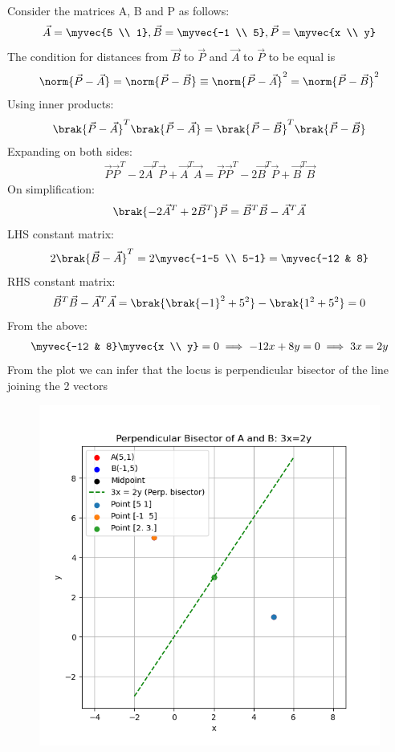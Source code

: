 \documentclass[journal]{IEEEtran}
\begin{document}
	\solution \\
	Consider the matrices A, B and P as follows:
	\begin{align*}
		\vec{A} = \myvec{5 \\ 1}, \vec{B} = \myvec{-1 \\ 5}, \vec{P}= \myvec{x \\ y}
	\end{align*}
	The condition for distances from $\vec{B}$ to $\vec{P}$ and $\vec{A}$ to $\vec{P}$ to be equal is
	\begin{align*}
		\norm{\vec{P}-\vec{A}} = \norm{\vec{P}-\vec{B}} \equiv \norm{\vec{P}-\vec{A}}^2 = \norm{\vec{P}-\vec{B}}^2
	\end{align*}
	Using inner products:
	\begin{align*}
		\brak{\vec{P}-\vec{A}}^{T}\brak{\vec{P}-\vec{A}} = \brak{\vec{P}-\vec{B}}^{T}\brak{\vec{P}-\vec{B}}
	\end{align*}
	Expanding on both sides:
	\begin{align*}
		\vec{P}\vec{P}^{T} - 2\vec{A}^{T}\vec{P} + \vec{A}^{T}\vec{A} = \vec{P}\vec{P}^{T} - 2\vec{B}^{T}\vec{P} + \vec{B}^{T}\vec{B}
	\end{align*}
	On simplification:
	\begin{align*}
		\brak{-2\vec{A}^{T} + 2\vec{B}^{T}}\vec{P} = \vec{B}^{T}\vec{B} - \vec{A}^{T}\vec{A}
	\end{align*} 
	LHS constant matrix:
	\begin{align*}
	2\brak{\vec{B}-\vec{A}}^{T} = 2\myvec{-1-5 \\ 5-1} = \myvec{-12 & 8}	
	\end{align*}
	RHS constant matrix:
	\begin{align*}
		\vec{B}^{T}\vec{B} - \vec{A}^{T}\vec{A} = \brak{\brak{-1}^2 + 5^2} - \brak{1^2 + 5^2} = 0
	\end{align*}
	From the above:
	\begin{align*}
		\myvec{-12 & 8}\myvec{x \\ y} = 0 \implies -12x + 8y = 0 \implies 3x = 2y
	\end{align*}
	From the plot we can infer that the locus is perpendicular bisector of the line joining the 2 vectors 
	\begin{figure}[H]
		\centering
		\includegraphics[width = 0.8\columnwidth]{fig.png}
		\caption*{}
		\label{fig}
	\end{figure}
\end{document}
